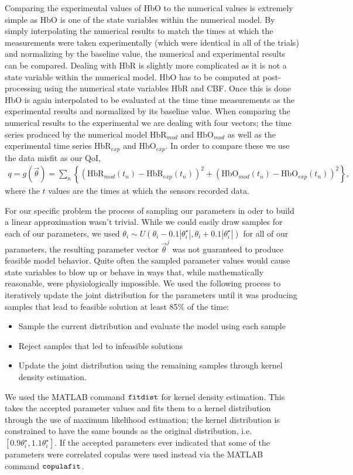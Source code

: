 \documentclass[10pt,letterpaper]{article}
\begin{document}
	Comparing the experimental values of HbO to the numerical values is extremely simple as HbO is one of the state variables within the numerical model. By simply interpolating the numerical results to match the times at which the measurements were taken experimentally (which were identical in all of the trials) and normalizing by the baseline value, the numerical and experimental results can be compared. Dealing with HbR is slightly more complicated as it is not a state variable within the numerical model. HbO has to be computed at post-processing using the numerical state variables HbR and CBF. Once this is done HbO is again interpolated to be evaluated at the time time measurements as the experimental results and normalized by its baseline value. When comparing the numerical results to the experimental we are dealing with four vectors; the time series produced by the numerical model $\text{HbR}_{mod}$ and $\text{HbO}_{mod}$ as well as the experimental time series $\text{HbR}_{exp}$ and $\text{HbO}_{exp}$. In order to compare these we use the data misfit as our QoI,
	\begin{align}
		q = g(\vec{\theta})= \sum_n \left\lbrace\left(\text{HbR}_{mod}(t_n)-\text{HbR}_{exp}(t_n)\right)^2 + \left(\text{HbO}_{mod}(t_n)-\text{HbO}_{exp}(t_n)\right)^2\right\rbrace, \label{Equation: QoI}
	\end{align}
	where the $t$ values are the times at which the sensors recorded data.
	
	For our specific problem the process of sampling our parameters in oder to build a linear approximation wasn't trivial. While we could easily draw samples for each of our parameters, we used $\theta_i\sim U(\theta_i-0.1|\theta_i^\star|,\theta_i+0.1|\theta_i^\star|)$ for all of our parameters, the resulting parameter vector $\vec{\theta}^j$ was not guaranteed to produce feasible model behavior. Quite often the sampled parameter values would cause state variables to blow up or behave in ways that, while mathematically reasonable, were physiologically impossible. We used the following process to iteratively update the joint distribution for the parameters until it was producing samples that lead to feasible solution at least 85\% of the time:
	\begin{itemize}
		\item Sample the current distribution and evaluate the model using each sample
		\item Reject samples that led to infeasible solutions
		\item Update the joint distribution using the remaining samples through kernel density estimation.
	\end{itemize}
	We used the MATLAB command $\verb|fitdist|$ for kernel density estimation. This takes the accepted parameter values and fits them to a kernel distribution through the use of maximum likelihood estimation; the kernel distribution is constrained to have the same bounds as the original distribution, i.e. $[0.9\theta_i^\star,1.1\theta_i^\star]$. If the accepted parameters ever indicated that some of the parameters were correlated copulas were used instead via the MATLAB command $\verb|copulafit|$. 
	
\end{document}
